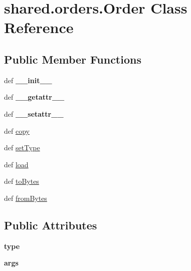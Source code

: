 \hypertarget{classshared_1_1orders_1_1_order}{\section{shared.\-orders.\-Order \-Class \-Reference}
\label{classshared_1_1orders_1_1_order}
}
\subsection*{\-Public \-Member \-Functions}
\begin{DoxyCompactItemize}
\item 
\hypertarget{classshared_1_1orders_1_1_order_a4478fd3a03356540f1c1859ef336a1e2}{def {\bfseries \-\_\-\-\_\-init\-\_\-\-\_\-}}\label{classshared_1_1orders_1_1_order_a4478fd3a03356540f1c1859ef336a1e2}

\item 
\hypertarget{classshared_1_1orders_1_1_order_a1952f34001480c2d172c1ab35fd843a2}{def {\bfseries \-\_\-\-\_\-getattr\-\_\-\-\_\-}}\label{classshared_1_1orders_1_1_order_a1952f34001480c2d172c1ab35fd843a2}

\item 
\hypertarget{classshared_1_1orders_1_1_order_a9f2e005477b1c296d81deb4e9a6d6d33}{def {\bfseries \-\_\-\-\_\-setattr\-\_\-\-\_\-}}\label{classshared_1_1orders_1_1_order_a9f2e005477b1c296d81deb4e9a6d6d33}

\item 
def \hyperlink{classshared_1_1orders_1_1_order_adcb3a330399f040c79376b01917230d1}{copy}
\item 
def \hyperlink{classshared_1_1orders_1_1_order_a3ac33fe06d9a4454150cca3bee3343c0}{set\-Type}
\item 
def \hyperlink{classshared_1_1orders_1_1_order_aa5781bf19ff8885b165b3dd92c7d1af3}{load}
\item 
def \hyperlink{classshared_1_1orders_1_1_order_adf66e6b17b828cd3b756c5bf99100626}{to\-Bytes}
\item 
def \hyperlink{classshared_1_1orders_1_1_order_ad490c06cccc13a50a6cb4f1a13c20428}{from\-Bytes}
\end{DoxyCompactItemize}
\subsection*{\-Public \-Attributes}
\begin{DoxyCompactItemize}
\item 
\hypertarget{classshared_1_1orders_1_1_order_aaa9dd375f76d0b41a4d39a387b931ddf}{{\bfseries type}}\label{classshared_1_1orders_1_1_order_aaa9dd375f76d0b41a4d39a387b931ddf}

\item 
\hypertarget{classshared_1_1orders_1_1_order_aed7b49791554e3403af9f6eef5cebb84}{{\bfseries args}}\label{classshared_1_1orders_1_1_order_aed7b49791554e3403af9f6eef5cebb84}

\end{DoxyCompactItemize}
